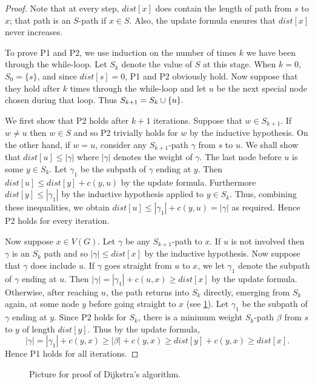 \begin{proof} 
Note that at every step, $dist[x]$ does contain
the length of  path from $s$ to $x$; that path is an
$S$-path if $x\in S$. Also, the update formula ensures that $dist[x]$
never increases. 

To prove P1 and P2, we use induction on the number of times $k$ we
have been through the while-loop. Let $S_k$ denote the value of $S$
at this stage. When $k=0$, $S_0=\{s\}$, and since $dist[s]=0$, P1 and
P2 obviously hold. Now suppose that they hold after $k$ times through
the while-loop and let $u$ be the next special node chosen during that
loop. Thus $S_{k+1} = S_k \cup \mbox{$\{u\}$}.$

We first show that P2 holds after $k+1$ iterations. Suppose that
$w\in S_{k+1}$.  If $w\neq u$ then $w\in S$ and so P2 trivially
holds for $w$ by the inductive hypothesis. On the other hand,
if $w=u$, consider any $S_{k+1}$-path $\gamma$ from $s$ to $u$.
We shall show that $dist[u] \leq
|\gamma |$ where $| \gamma | $ denotes the weight of $\gamma$. The
last node before $u$ is some $y\in S_k$. Let $\gamma_1$ be the subpath
of $\gamma$ ending at $y$. Then $dist[u] \leq dist[y] + c(y,u)$ by the
update formula. Furthermore $dist[y] \leq |\gamma_1 |$ by the inductive
hypothesis applied to $y\in S_k$. Thus, combining these inequalities,
we obtain $dist[u] \leq |\gamma_1 | + c(y, u) = | \gamma |$ as
required. Hence P2 holds for every iteration.

Now suppose $x\in V(G)$. Let $\gamma$ be any $S_{k+1}$-path to $x$. If
$u$ is not involved then $\gamma$ is an $S_k$ path and so $|\gamma| \leq
dist[x]$ by the inductive hypothesis. Now suppose that $\gamma$ does
include $u$. 
If $\gamma$ goes straight from $u$ to $x$, we let $\gamma_1$ denote the 
subpath of $\gamma$ ending at $u$. Then $|\gamma| = |\gamma_1| + c(u,x) \geq 
dist[x]$ by the update formula. 
Otherwise, after reaching $u$, the path returns into $S_k$
directly, emerging from $S_k$ again, at some node $y$ before going
straight to $x$ (see \cref{fig:dijk-proof2}). Let $\gamma_1$
be the subpath of $\gamma$ ending at $y$. Since P2 holds for $S_k$,
there is a minimum weight $S_k$-path $\beta$ from $s$ to $y$ of length
$dist[y]$. Thus by the update formula, 
$$
|\gamma| = |\gamma_1| + c(y,
x) \geq |\beta| + c(y, x) \geq dist[y] + c(y, x) \geq dist[x].
$$ 
Hence P1 holds for all iterations.
\end{proof}

\begin{figure}
\caption{Picture for proof of Dijkstra's algorithm.}
\label{fig:dijk-proof2}
\end{figure}

